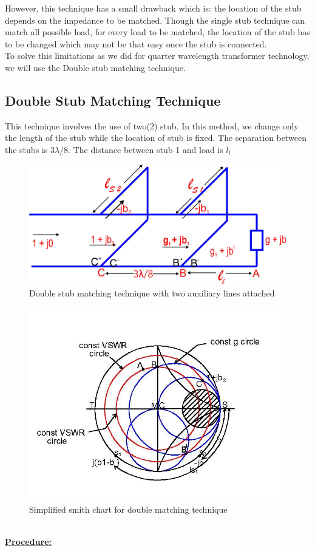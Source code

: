 \begin{enumerate}[(i)]
However, this technique has a small drawback which is: the location of the stub  depends on the impedance to be matched. Though the single stub technique can match all possible load, for every load to be matched, the location of the stub has to be changed which may not be that easy once the stub is connected.\\

To solve this limitations as we did for quarter wavelength transformer technology, we will use the Double stub matching technique.
\subsection{Double Stub Matching Technique}

This technique involves the use of two(2) stub. In this method, we change only the length of the stub while the location of stub is fixed. The separation between the stubs is $ 3\lambda/8$. The distance between stub 1 and load is $l_l$%
\begin{figure}[h]
\centering
\includegraphics[width=1\linewidth]{./graphics/fig12}
\caption{Double stub matching technique with two auxiliary lines attached}
\end{figure}
\begin{figure}[h]
\centering
\includegraphics[width=1\linewidth]{./graphics/dousmith}
\caption{Simplified smith chart for double matching technique}
\end{figure}\\
\underline{\textbf{Procedure:} } \\


\end{enumerate}

